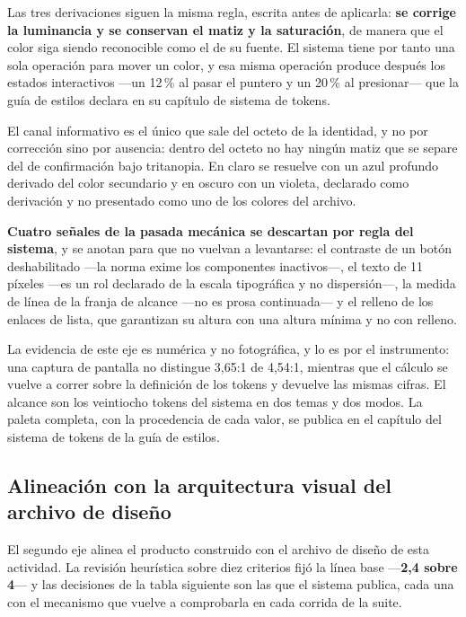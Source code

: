 Las tres derivaciones siguen la misma regla, escrita antes de aplicarla: \textbf{se corrige la
luminancia y se conservan el matiz y la saturación}, de manera que el color siga siendo reconocible
como el de su fuente. El sistema tiene por tanto una sola operación para mover un color, y esa misma
operación produce después los estados interactivos ---un 12\,\% al pasar el puntero y un 20\,\% al
presionar--- que la guía de estilos declara en su capítulo de sistema de tokens.

El canal informativo es el único que sale del octeto de la identidad, y no por corrección sino por
ausencia: dentro del octeto no hay ningún matiz que se separe del de confirmación bajo tritanopia.
En claro se resuelve con un azul profundo derivado del color secundario y en oscuro con un violeta,
declarado como derivación y no presentado como uno de los colores del archivo.

\textbf{Cuatro señales de la pasada mecánica se descartan por regla del sistema}, y se anotan para
que no vuelvan a levantarse: el contraste de un botón deshabilitado ---la norma exime los
componentes inactivos---, el texto de 11 píxeles ---es un rol declarado de la escala tipográfica y
no dispersión---, la medida de línea de la franja de alcance ---no es prosa continuada--- y el
relleno de los enlaces de lista, que garantizan su altura con una altura mínima y no con relleno.

La evidencia de este eje es numérica y no fotográfica, y lo es por el instrumento: una captura de
pantalla no distingue 3{,}65:1 de 4{,}54:1, mientras que el cálculo se vuelve a correr sobre la
definición de los tokens y devuelve las mismas cifras. El alcance son los veintiocho tokens del
sistema en dos temas y dos modos. La paleta completa, con la procedencia de cada valor, se
publica en el capítulo del sistema de tokens de la guía de estilos.

\subsection{Alineación con la arquitectura visual del archivo de diseño}

El segundo eje alinea el producto construido con el archivo de diseño de esta actividad. La revisión
heurística sobre diez criterios fijó la línea base ---\textbf{2{,}4 sobre 4}--- y las decisiones de
la tabla siguiente son las que el sistema publica, cada una con el mecanismo que vuelve a
comprobarla en cada corrida de la suite.

